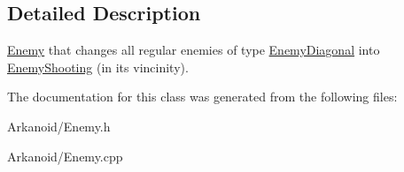 \subsection{Detailed Description}
\hyperlink{class_enemy}{Enemy} that changes all regular enemies of type \hyperlink{class_enemy_diagonal}{Enemy\+Diagonal} into \hyperlink{class_enemy_shooting}{Enemy\+Shooting} (in its vincinity). 

The documentation for this class was generated from the following files\+:\begin{DoxyCompactItemize}
\item 
Arkanoid/Enemy.\+h\item 
Arkanoid/Enemy.\+cpp\end{DoxyCompactItemize}
